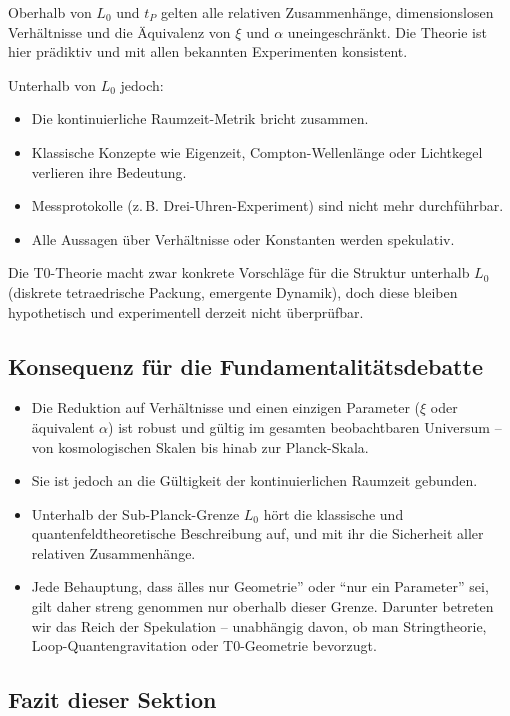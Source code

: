 Oberhalb von \(L_0\) und \(t_P\) gelten alle relativen Zusammenhänge, dimensionslosen Verhältnisse und die Äquivalenz von \(\xi\) und \(\alpha\) uneingeschränkt. Die Theorie ist hier prädiktiv und mit allen bekannten Experimenten konsistent.

Unterhalb von \(L_0\) jedoch:
\begin{itemize}
	\item Die kontinuierliche Raumzeit-Metrik bricht zusammen.
	\item Klassische Konzepte wie Eigenzeit, Compton-Wellenlänge oder Lichtkegel verlieren ihre Bedeutung.
	\item Messprotokolle (z.\,B. Drei-Uhren-Experiment) sind nicht mehr durchführbar.
	\item Alle Aussagen über Verhältnisse oder Konstanten werden spekulativ.
\end{itemize}

Die T0-Theorie macht zwar konkrete Vorschläge für die Struktur unterhalb \(L_0\) (diskrete tetraedrische Packung, emergente Dynamik), doch diese bleiben hypothetisch und experimentell derzeit nicht überprüfbar.

\subsection{Konsequenz für die Fundamentalitätsdebatte}

\begin{itemize}
	\item Die Reduktion auf Verhältnisse und einen einzigen Parameter (\(\xi\) oder äquivalent \(\alpha\)) ist robust und gültig im gesamten beobachtbaren Universum – von kosmologischen Skalen bis hinab zur Planck-Skala.
	\item Sie ist jedoch an die Gültigkeit der kontinuierlichen Raumzeit gebunden.
	\item Unterhalb der Sub-Planck-Grenze \(L_0\) hört die klassische und quantenfeldtheoretische Beschreibung auf, und mit ihr die Sicherheit aller relativen Zusammenhänge.
	\item Jede Behauptung, dass älles nur Geometrie'' oder ``nur ein Parameter'' sei, gilt daher streng genommen nur oberhalb dieser Grenze. Darunter betreten wir das Reich der Spekulation – unabhängig davon, ob man Stringtheorie, Loop-Quantengravitation oder T0-Geometrie bevorzugt.
\end{itemize}

\subsection{Fazit dieser Sektion}

